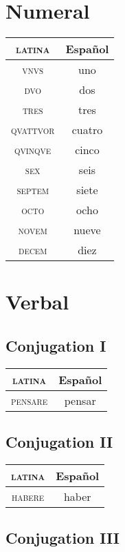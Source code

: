 \documentclass{report}
\begin{document}
\section{Numeral}

\begin{tabular}{|c|c|}
  \hline
  \textsc{latina} & Español \\
  \hline
  \textsc{vnvs} & uno \\
  \hline
  \textsc{dvo} & dos \\
  \hline
  \textsc{tres} & tres \\
  \hline
  \textsc{qvattvor} & cuatro \\
  \hline
  \textsc{qvinqve} & cinco \\
  \hline
  \textsc{sex} & seis \\
  \hline
  \textsc{septem} & siete \\
  \hline
  \textsc{octo} & ocho \\
  \hline
  \textsc{novem} & nueve \\
  \hline
  \textsc{decem} & diez \\
  \hline
\end{tabular}

\section{Verbal}

\subsection{Conjugation I}

\begin{tabular}{|c|c|}
  \hline
  \textsc{latina} & Español \\
  \hline
  \textsc{pensare} & pensar \\
  \hline
\end{tabular}

\subsection{Conjugation II}

\begin{tabular}{|c|c|}
  \hline
  \textsc{latina} & Español \\
  \hline
  \textsc{habere} & haber \\
  \hline
\end{tabular}

\subsection{Conjugation III}
\end{document}
